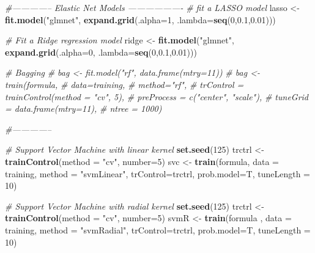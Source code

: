 \documentclass[
  10pt,
]{article}
\newenvironment{Shaded}{\begin{snugshade}}{\end{snugshade}}
\newcommand{\CommentTok}[1]{\textcolor[rgb]{0.56,0.35,0.01}{\textit{#1}}}
\newcommand{\DataTypeTok}[1]{\textcolor[rgb]{0.13,0.29,0.53}{#1}}
\newcommand{\DecValTok}[1]{\textcolor[rgb]{0.00,0.00,0.81}{#1}}
\newcommand{\FloatTok}[1]{\textcolor[rgb]{0.00,0.00,0.81}{#1}}
\newcommand{\KeywordTok}[1]{\textcolor[rgb]{0.13,0.29,0.53}{\textbf{#1}}}
\newcommand{\NormalTok}[1]{#1}
\newcommand{\StringTok}[1]{\textcolor[rgb]{0.31,0.60,0.02}{#1}}
\begin{document}
\begin{Shaded}
\begin{Highlighting}[]
{{{\CommentTok{#-------------- Elastic Net Models -------------------}
\CommentTok{# fit a LASSO model}
\NormalTok{lasso <-}\StringTok{ }\KeywordTok{fit.model}\NormalTok{(}\StringTok{"glmnet"}\NormalTok{, }\KeywordTok{expand.grid}\NormalTok{(}\DataTypeTok{.alpha=}\DecValTok{1}\NormalTok{, }\DataTypeTok{.lambda=}\KeywordTok{seq}\NormalTok{(}\DecValTok{0}\NormalTok{,}\FloatTok{0.1}\NormalTok{,}\FloatTok{0.01}\NormalTok{)))}

\CommentTok{# Fit a Ridge regression model}
\NormalTok{ridge <-}\StringTok{ }\KeywordTok{fit.model}\NormalTok{(}\StringTok{"glmnet"}\NormalTok{, }\KeywordTok{expand.grid}\NormalTok{(}\DataTypeTok{.alpha=}\DecValTok{0}\NormalTok{, }\DataTypeTok{.lambda=}\KeywordTok{seq}\NormalTok{(}\DecValTok{0}\NormalTok{,}\FloatTok{0.1}\NormalTok{,}\FloatTok{0.01}\NormalTok{)))}




\CommentTok{# Bagging}
\CommentTok{# bag <- fit.model("rf", data.frame(mtry=11))}
\CommentTok{# bag <- train(formula,}
\CommentTok{#                  data=training,}
\CommentTok{#                  method="rf",}
\CommentTok{#                 trControl = trainControl(method = "cv", 5),}
\CommentTok{#                 preProcess = c("center", "scale"),}
\CommentTok{#                 tuneGrid = data.frame(mtry=11),}
\CommentTok{#                 ntree = 1000) }




\CommentTok{#-------------- }

\CommentTok{# Support Vector Machine with linear kernel}
\KeywordTok{set.seed}\NormalTok{(}\DecValTok{125}\NormalTok{)}
\NormalTok{trctrl <-}\StringTok{ }\KeywordTok{trainControl}\NormalTok{(}\DataTypeTok{method =} \StringTok{"cv"}\NormalTok{, }\DataTypeTok{number=}\DecValTok{5}\NormalTok{)}
\NormalTok{svc <-}\StringTok{ }\KeywordTok{train}\NormalTok{(formula, }\DataTypeTok{data =}\NormalTok{ training, }\DataTypeTok{method =} \StringTok{"svmLinear"}\NormalTok{,}
                    \DataTypeTok{trControl=}\NormalTok{trctrl, }\DataTypeTok{prob.model=}\NormalTok{T,}
                    \DataTypeTok{tuneLength =} \DecValTok{10}\NormalTok{)}




\CommentTok{# Support Vector Machine with radial kernel}
\KeywordTok{set.seed}\NormalTok{(}\DecValTok{125}\NormalTok{)}
\NormalTok{trctrl <-}\StringTok{ }\KeywordTok{trainControl}\NormalTok{(}\DataTypeTok{method =} \StringTok{"cv"}\NormalTok{, }\DataTypeTok{number=}\DecValTok{5}\NormalTok{)}
\NormalTok{svmR <-}\StringTok{ }\KeywordTok{train}\NormalTok{(formula , }\DataTypeTok{data =}\NormalTok{ training, }\DataTypeTok{method =} \StringTok{"svmRadial"}\NormalTok{,}
                    \DataTypeTok{trControl=}\NormalTok{trctrl, }\DataTypeTok{prob.model=}\NormalTok{T,}
                    \DataTypeTok{tuneLength =} \DecValTok{10}\NormalTok{)}



}}}
\end{Highlighting}
\end{Shaded}
\end{document}
